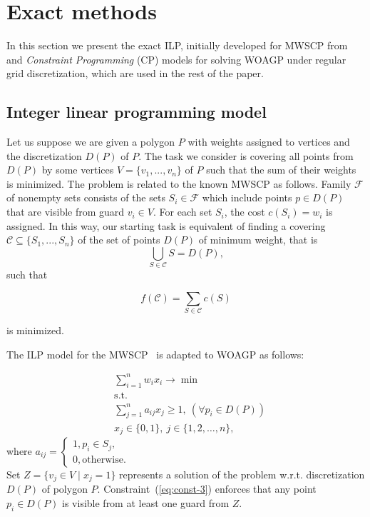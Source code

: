 \documentclass[runningheads,a4paper]{elsarticle}
\begin{document}
	\section{Exact methods}
	In this section we present the exact ILP,  initially developed for MWSCP from~\cite{vazirani2013approximation} and \emph{Constraint Programming} (CP) models for solving WOAGP  under regular grid discretization, which are used  in the rest of the paper.
	\subsection{Integer linear programming model}
	Let us suppose we are given a polygon $P$ with weights assigned to vertices and the discretization $D(P)$ of $P$.  The task we consider is covering all points from $D(P)$ by some vertices $V=\{v_1,...,v_n\}$ of $P$ such that the sum of their weights is minimized.
	The problem is related to the known MWSCP  as follows.
	Family $\mathcal{F}$ of nonempty sets consists of the sets
	$S_i \in \mathcal{F}$ which include points $p \in D(P)$ that are visible from guard $v_i\in V$.  For each set $S_i$, the cost $c(S_i) = w_i$ is assigned.  In this way, our starting task is equivalent of finding a  covering $\mathcal{C}\subseteq\{S_1,...,S_n\}$ of the set of points $D(P)$ of minimum weight, that is
	$$ \bigcup_{S \in \mathcal{C}} S = D(P),$$ such that

$$f(\mathcal{C}) = \sum_{S \in \mathcal{C}} c(S)$$

 is minimized.

The ILP  model for the MWSCP~\cite{vazirani2013approximation}   is  adapted to WOAGP  as follows:

	\begin{align}
	&\sum_{i=1}^n w_ix_i \longrightarrow \min  \label{eq:woagp-min}\\
	&\mbox{s.t.}\nonumber \\
	&\sum_{j=1}^n a_{ij}x_j \geq 1,\ (\forall p_i\in D(P)) \label{eq:const-3}\\
	& x_j \in \{0,1\},\ j\in\{1,2,\ldots,n\}\label{eq:const-4},
	\end{align}
	where
	$a_{ij} = \begin{cases}
	1, p_i \in S_j, \\
	0, \mbox{otherwise}.
	\end{cases}$
	 \\

	Set $Z = \{v_j \in V\mid x_j=1\}$ represents a solution of the problem w.r.t. discretization $D(P)$ of polygon $P$.
	Constraint~(\ref{eq:const-3}) enforces that any point $p_i \in D(P)$ is visible from at least one guard from $Z$.
	
\end{document}
